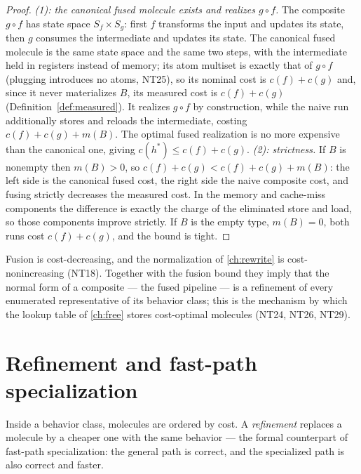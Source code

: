 \begin{proof}
\emph{(1): the canonical fused molecule exists and realizes $g \circ f$.} The
composite $g \circ f$ has state space $S_f \times S_g$: first $f$ transforms
the input and updates its state, then $g$ consumes the intermediate and
updates its state. The canonical fused molecule is the same state space and
the same two steps, with the intermediate held in registers instead of memory;
its atom multiset is exactly that of $g \circ f$ (plugging introduces no
atoms, NT25), so its nominal cost is $c(f) + c(g)$ and, since it never
materializes $B$, its measured cost is $c(f) + c(g)$
(Definition~\ref{def:measured}). It realizes $g \circ f$ by construction,
while the naive run additionally stores and reloads the intermediate, costing
$c(f) + c(g) + m(B)$. The optimal fused realization is no more expensive than
the canonical one, giving $c(h^{*}) \le c(f) + c(g)$.
\emph{(2): strictness.} If $B$ is nonempty then $m(B) > 0$, so
$c(f) + c(g) < c(f) + c(g) + m(B)$: the left side is the canonical fused cost,
the right side the naive composite cost, and fusing strictly decreases the
measured cost. In the memory and cache-miss components the difference is
exactly the charge of the eliminated store and load, so those components
improve strictly. If $B$ is the empty type, $m(B) = 0$, both runs cost
$c(f) + c(g)$, and the bound is tight.
\end{proof}

\begin{remark}
Fusion is cost-decreasing, and the normalization of \autoref{ch:rewrite} is
cost-nonincreasing (NT18). Together with the fusion bound they imply that the
normal form of a composite --- the fused pipeline --- is a refinement of every
enumerated representative of its behavior class; this is the mechanism by
which the lookup table of \autoref{ch:free} stores cost-optimal molecules
(NT24, NT26, NT29).
\end{remark}

\section{Refinement and fast-path specialization}\label{sec:enrich-refine}

Inside a behavior class, molecules are ordered by cost. A \emph{refinement}
replaces a molecule by a cheaper one with the same behavior --- the formal
counterpart of fast-path specialization: the general path is correct, and the
specialized path is also correct and faster.

